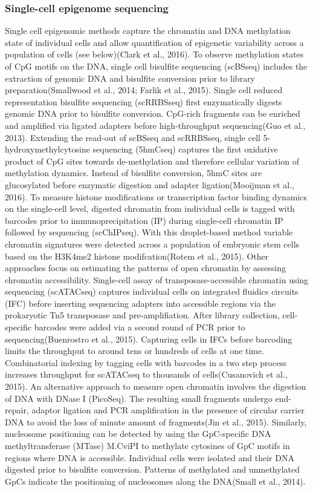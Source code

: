 \subsubsection{Single-cell epigenome sequencing}

Single cell epigenomic methods capture the chromatin and DNA methylation state of individual cells and allow quantification of epigenetic variability across a population of cells (see below)(Clark et al., 2016). To observe methylation states of CpG motifs on the DNA, single cell bisulfite sequencing (scBSseq) includes the extraction of genomic DNA and bisulfite conversion prior to library preparation(Smallwood et al., 2014; Farlik et al., 2015). Single cell reduced representation bisulfite sequencing (scRRBSseq) first enzymatically digests genomic DNA prior to bisulfite conversion. CpG-rich fragments can be enriched and amplified via ligated adapters before high-throughput sequencing(Guo et al., 2013). Extending the read-out of scBSseq and scRRBSseq, single cell 5-hydroxymethylcytosine sequencing (5hmCseq) captures the first oxidative product of CpG sites towards de-methylation and therefore cellular variation of methylation dynamics. Instead of bisulfite conversion, 5hmC sites are glucosylated before enzymatic digestion and adapter ligation(Mooijman et al., 2016).
To measure histone modifications or transcription factor binding dynamics on the single-cell level, digested chromatin from individual cells is tagged with barcodes prior to immunoprecipitation (IP) during single-cell chromatin IP followed by sequencing (scChIPseq). With this droplet-based method variable chromatin signatures were detected across a population of embryonic stem cells based on the H3K4me2 histone modifcation(Rotem et al., 2015). 
Other approaches focus on estimating the patterns of open chromatin by assessing chromatin accessibility. Single-cell assay of transposase-accessible chromatin using sequencing (scATACseq) captures individual cells on integrated fluidics circuits (IFC) before inserting sequencing adapters into accessible regions via the prokaryotic Tn5 transposase and pre-amplifiation. After library collection, cell-specific barcodes were added via a second round of PCR prior to sequencing(Buenrostro et al., 2015).  Capturing cells in IFCs before barcoding limits the throughput to around tens or hundreds of cells at one time. Combinatorial indexing by tagging cells with barcodes in a two step process increases throughput for scATACseq to thousands of cells(Cusanovich et al., 2015). An alternative approach to measure open chromatin involves the digestion of DNA with DNase I (PicoSeq). The resulting small fragments undergo end-repair, adaptor ligation and PCR amplification in the presence of circular carrier DNA to avoid the loss of minute amount of fragments(Jin et al., 2015). Similarly, nucleosome positioning can be detected by using the GpC-specific DNA methyltransferase (MTase) M.CviPI to methylate cytosines of GpC motifs in regions where DNA is accessible. Individual cells were isolated and their DNA digested prior to bisulfite conversion. Patterns of methylated and unmethylated GpCs indicate the positioning of nucleosomes along the DNA(Small et al., 2014).
